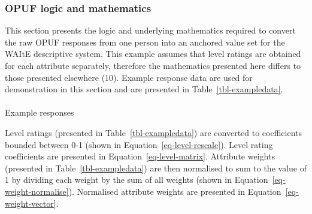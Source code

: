 \documentclass[
  letterpaper,
  DIV=11,
  numbers=noendperiod]{scrartcl}
\makeatletter
\let\oldparagraph\paragraph
\renewcommand{\paragraph}{
    \@ifstar
      \xxxParagraphStar
      \xxxParagraphNoStar
  }
\newcommand{\xxxParagraphStar}[1]{\oldparagraph*{#1}\mbox{}}
\newcommand{\xxxParagraphNoStar}[1]{\oldparagraph{#1}\mbox{}}
\makeatother
\begin{document}
\subsubsection{OPUF logic and mathematics}\label{sec-OPUF_methods}

This section presents the logic and underlying mathematics required to
convert the raw OPUF responses from one person into an anchored value
set for the WAItE descriptive system. This example assumes that level
ratings are obtained for each attribute separately, therefore the
mathematics presented here differs to those presented elsewhere (10).
Example response data are used for demonstration in this section and are
presented in Table~\ref{tbl-exampledata}.

\newpage

\paragraph{Example responses}\label{example-responses}

\begin{table}

\caption{\label{tbl-exampledata}Example individual responses to the
OPUF}


\end{table}%

Level ratings (presented in Table~\ref{tbl-exampledata}) are converted
to coefficients bounded between 0-1 (shown in
Equation~\ref{eq-level-rescale}). Level rating coefficients are
presented in Equation~\ref{eq-level-matrix}. Attribute weights
(presented in Table~\ref{tbl-exampledata}) are then normalised to sum to
the value of 1 by dividing each weight by the sum of all weights (shown
in Equation~\ref{eq-weight-normalise}). Normalised attribute weights are
presented in Equation~\ref{eq-weight-vector}.
\end{document}
